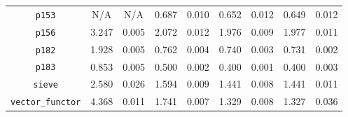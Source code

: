 \documentclass[12pt,a4paper,twoside,openright]{report}
\begin{document}
\begin{table}[h]
\begin{tabular}{| c | c c | c c | c c | c c |}
\lstinline!p153!              &                                N/A &    N/A & \cellcolor[hsb]{0.0,0.357,1}0.687 & 0.010 & \cellcolor[hsb]{0.0,0.314,1}0.652 & 0.012 & \cellcolor[hsb]{0.0,0.310,1}0.649 & 0.012 \\
\lstinline!p156!              & \cellcolor[hsb]{0.0,1.000,1}3.247 & 0.005 & \cellcolor[hsb]{0.0,0.511,1}2.072 & 0.012 & \cellcolor[hsb]{0.0,0.464,1}1.976 & 0.009 & \cellcolor[hsb]{0.0,0.465,1}1.977 & 0.011 \\
\lstinline!p182!              & \cellcolor[hsb]{0.0,0.368,1}1.928 & 0.005 & \cellcolor[hsb]{0.3,0.314,1}0.762 & 0.004 & \cellcolor[hsb]{0.3,0.334,1}0.740 & 0.003 & \cellcolor[hsb]{0.3,0.342,1}0.731 & 0.002 \\
\lstinline!p183!              & \cellcolor[hsb]{0.0,0.458,1}0.853 & 0.005 & \cellcolor[hsb]{0.0,0.062,1}0.500 & 0.002 & \cellcolor[hsb]{0.3,0.102,1}0.400 & 0.001 & \cellcolor[hsb]{0.3,0.102,1}0.400 & 0.003 \\
\lstinline!sieve!             & \cellcolor[hsb]{0.3,0.066,1}2.580 & 0.026 & \cellcolor[hsb]{0.3,0.423,1}1.594 & 0.009 & \cellcolor[hsb]{0.3,0.478,1}1.441 & 0.008 & \cellcolor[hsb]{0.3,0.478,1}1.441 & 0.011 \\
\lstinline!vector_functor!    & \cellcolor[hsb]{0.3,0.272,1}4.368 & 0.011 & \cellcolor[hsb]{0.3,0.710,1}1.741 & 0.007 & \cellcolor[hsb]{0.3,0.779,1}1.329 & 0.008 & \cellcolor[hsb]{0.3,0.779,1}1.327 & 0.036 \\
\hline
\end{tabular}


\end{table}
\end{document}
